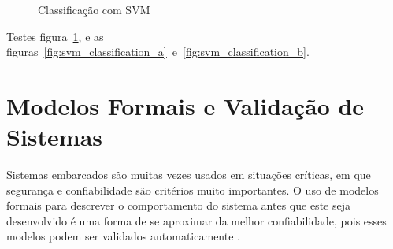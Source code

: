 \begin{figure}[h]
    \centering
    \caption{Classificação com SVM}
    \label{fig:svm_classification}
        \hfill
\end{figure}
Testes figura~\ref{fig:svm_classification}, e as figuras~\ref{fig:svm_classification_a}~e~\ref{fig:svm_classification_b}.


\section{Modelos Formais e Validação de Sistemas}
\label{sec:modelosformais}
Sistemas embarcados são muitas vezes usados em situações críticas, em que segurança e confiabilidade são critérios muito importantes. O uso de modelos formais para descrever o comportamento do sistema antes que este seja desenvolvido é uma forma de se aproximar da melhor confiabilidade, pois esses modelos podem ser validados automaticamente \cite{edwards:1997}.
